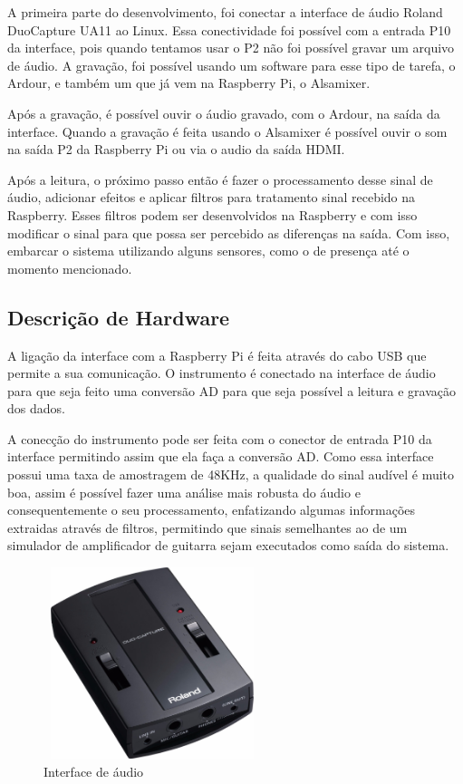 \documentclass[conference]{IEEEtran}
\begin{document}
A primeira parte do desenvolvimento, foi conectar a interface de áudio Roland DuoCapture UA11 ao Linux. 
Essa conectividade foi possível com a entrada P10 da interface, pois quando tentamos usar o P2 não foi possível gravar um arquivo de áudio. A gravação, foi possível usando um software para esse tipo de tarefa, o Ardour, e também um que já vem na Raspberry Pi, o Alsamixer.

Após a gravação, é possível ouvir o áudio gravado, com o Ardour, na saída da interface. Quando a gravação é feita usando o Alsamixer é possível ouvir o som na saída P2 da Raspberry Pi ou via o audio da saída HDMI. 

Após a leitura, o próximo passo então é fazer o processamento desse sinal de áudio, adicionar efeitos e aplicar filtros para tratamento sinal recebido na Raspberry. Esses filtros podem ser desenvolvidos na Raspberry e com isso modificar o sinal para que possa ser percebido as diferenças na saída. Com isso, embarcar o sistema utilizando alguns sensores, como o de presença até o momento mencionado.

\subsection{Descrição de Hardware}

A ligação da interface com a Raspberry Pi é feita através do cabo USB que permite a sua comunicação. O instrumento é conectado na interface de áudio para que seja feito uma conversão AD para que seja possível a leitura e gravação dos dados. 

A conecção do instrumento pode ser feita com o conector de entrada P10 da interface permitindo assim que ela faça a conversão AD. Como essa interface possui uma taxa de amostragem de 48KHz, a qualidade do sinal audível é muito boa, assim é possível fazer uma análise mais robusta do áudio e consequentemente o seu processamento, enfatizando algumas informações extraidas através de filtros, permitindo que sinais semelhantes ao de um simulador de amplificador de guitarra sejam executados como saída do sistema.

\begin{figure}[!htb]
\centering
\includegraphics[width=2.5in, height=2.2in]{Imagens/interface}
\caption{Interface de áudio} 
\label{interface}
\end{figure}
\end{document}
